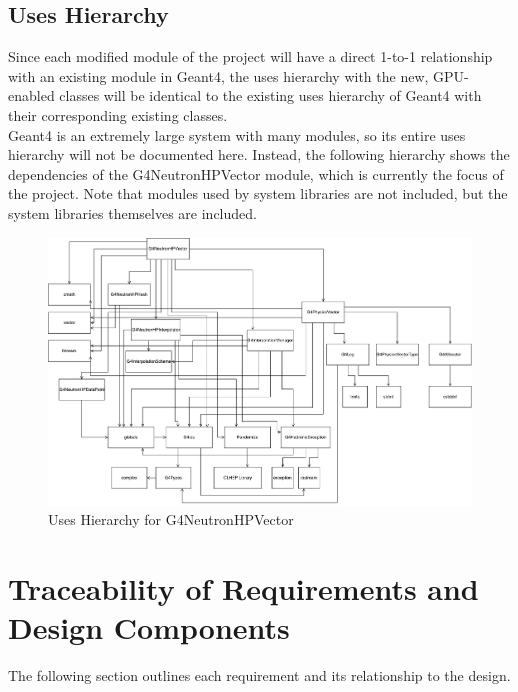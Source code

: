 \documentclass[12pt]{article}
\begin{document}
\subsection{Uses Hierarchy}
Since each modified module of the project will have a direct 1-to-1 relationship with an existing module in Geant4, the uses hierarchy with the new, GPU-enabled classes will be identical to the existing uses hierarchy of Geant4 with their corresponding existing classes.\\

Geant4 is an extremely large system with many modules, so its entire uses hierarchy will not be documented here. Instead, the following hierarchy shows the dependencies of the G4NeutronHPVector module, which is currently the focus of the project. Note that modules used by system libraries are not included, but the system libraries themselves are included.
\begin{figure}[h]
\caption{Uses Hierarchy for G4NeutronHPVector}\label{imgUsesHierarchy}
\includegraphics[width=\textwidth]{uses_hierarchy.pdf}
\end{figure}

\section{Traceability of Requirements and Design Components}%
The following section outlines each requirement and its relationship to the design.
\end{document}
